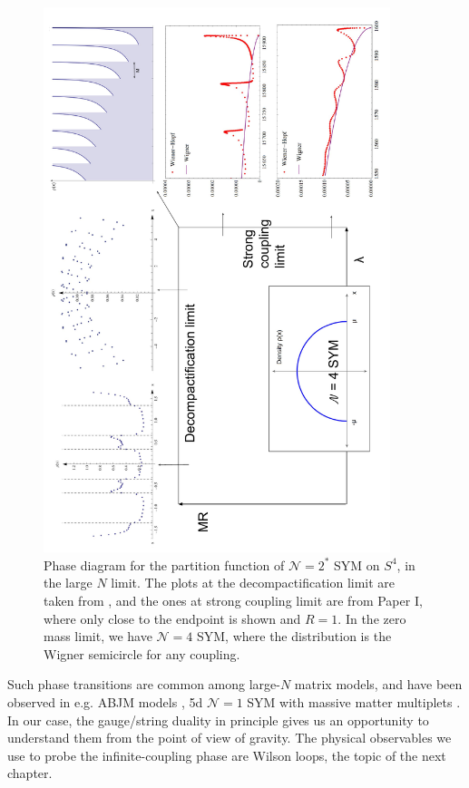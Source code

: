 \begin{figure}[t]
\begin{center}
 \centerline{\includegraphics[width=0.9\textwidth]{Images/phaseDiagram.pdf}}
\end{center}
\caption{\label{fig:phaseDiagram} Phase diagram for the partition function of $\mathcal{N}=2^*$ SYM on $S^4$, in the large $N$ limit. 
The plots at the decompactification limit are taken from \cite{Russo:2013qaa}, and the ones at strong coupling limit are from Paper I, where only close to the endpoint is shown and $R=1$.
In the zero mass limit, we have $\mathcal{N}=4$ SYM, where the distribution is the Wigner semicircle for any coupling.}
\end{figure}


Such phase transitions are common among large-$N$ matrix models, 
and have been observed in e.g. ABJM models \cite{Anderson:2014hxa}, 5d $\mathcal{N}=1$ SYM with massive matter multiplets \cite{Nedelin:2015mta}.
In our case, the gauge/string duality in principle gives us an opportunity to understand them from the point of view of gravity.
The physical observables we use to probe the infinite-coupling phase are Wilson loops, the topic of the next chapter.






